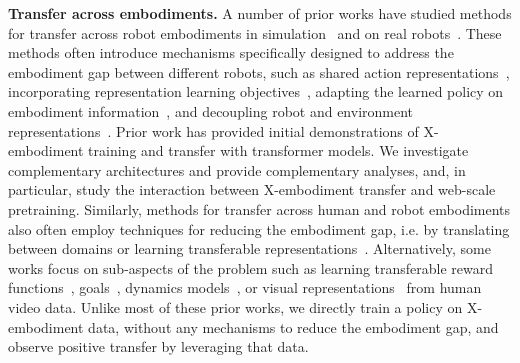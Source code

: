 \documentclass[letterpaper, 10 pt, conference]{ieeeconf}  %
\newcommand{\cro}{X}
\begin{document}
\noindent \textbf{Transfer across embodiments.} A number of prior works have studied methods for transfer across robot embodiments in simulation~\cite{devin2017learning,chen2018hardware,sanchez2018graph,pathak2019learning,martin2019iros,huang2020smp,kurin2020my,zakka2021xirl,ghadirzadeh2021bayesian,gupta2021metamorph,schubert2023generalist, shah2023gnm, Zhou2023Modularity} and on real robots~\cite{dasari2019robonet, hu2022know,bousmalis2023robocat,yang2023polybot,reed2022a,salhotra2023bridging,radosavovic2023robot}. These methods often introduce mechanisms specifically designed to address the embodiment gap between different robots, such as shared action representations~\cite{martin2019iros,shao2020unigrasp}, incorporating representation learning objectives~\cite{zakka2021xirl,yang2023polybot}, adapting the learned policy on embodiment information~\cite{shao2020unigrasp,xu2021adagrasp,chen2018hardware,ghadirzadeh2021bayesian,huang2020smp}, and decoupling robot and environment representations~\cite{hu2022know}. 
Prior work has provided initial demonstrations of \cro-embodiment training \cite{reed2022a} and transfer \cite{bousmalis2023robocat, shah2023vint, radosavovic2023robot} with transformer models. %
We investigate complementary architectures and provide complementary analyses, and, in particular, study the interaction between \cro-embodiment transfer and web-scale pretraining.
Similarly, methods for transfer across human and robot embodiments also often employ techniques for reducing the embodiment gap, i.e. by translating between domains or learning transferable representations~\cite{liu2018imitation,yu2018one,sharma2019third, smith2019avid,bonardi2020learning,schmeckpeper2021reinforcement,xiong2021learning,jang2022bc,bahl2022whirl,ding2023embodied,Bahl_2023_CVPR}. Alternatively, some works focus on sub-aspects of the problem such as learning transferable reward functions~\cite{sermanet2016unsupervised,zakka2021xirl,shao2020concept,chen2021learning,kumar2023graph,alakuijala2023learning}, goals~\cite{zhou2021manipulator,wang2023mimicplay}, dynamics models~\cite{schmeckpeper2020learning}, or visual representations~\cite{nair2022r3m,xiao2022masked,radosavovic2022real,ma2022vip,majumdar2023we,karamcheti2023language,mu2023ec2,bahl2023affordances} from human video data. Unlike most of these prior works, we directly train a policy on \cro-embodiment data, without any mechanisms to reduce the embodiment gap, and observe positive transfer by leveraging that data.
\end{document}
